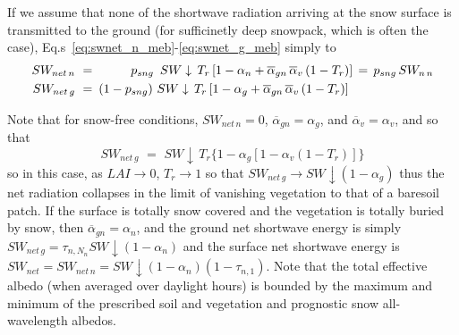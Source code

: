If we assume that none of the shortwave radiation arriving at the
snow surface is transmitted to the ground (for sufficinetly deep
snowpack, which is often the case), 
Eq.s~\ref{eq:swnet_n_meb}-\ref{eq:swnet_g_meb} simply to
%
\begin{align}
\label{eq:swnet_n_meb_nt}
SW_{net\,n} \,\,=&\,\, 
\hskip.38in p_{sng}\,\,\, SW\downarrow \, T_r 
\left[
1 - \alpha_n + {\overline\alpha}_{gn}\, 
{\overline\alpha}_v \left(1-T_r\right)
\right]
\,=\, p_{sng}\, SW_{n\,n}
\\
\label{eq:swnet_g_meb_nt}
SW_{net\,g} \,\,=&\,\, \left(1-p_{sng}\right) \, SW\downarrow \, T_r 
\left[
1 - \alpha_g + {\overline\alpha}_{gn}\, 
{\overline\alpha}_v \left(1-T_r\right)
\right] 
%
\end{align}


Note that for snow-free conditions, $SW_{net\,n}=0$,
${\overline\alpha}_{gn} = \alpha_g$, and
${\overline\alpha}_v = \alpha_v$, and
 so that
%
\begin{equation}
SW_{net\,g} \,\,=\,\, SW\downarrow \, T_r 
\big\lbrace
1 - \alpha_g \left[
1 - \alpha_v \left(1-T_r\right)\right]
\big\rbrace 
%
\end{equation}
%
so in this case, as $LAI\rightarrow 0$, $T_r\rightarrow 1$ so that
$SW_{net\,g} \rightarrow SW\downarrow \left( 1 -\alpha_g\right)$
thus the net radiation collapses in the limit of vanishing vegetation
to that of a baresoil patch. 
If the surface is totally snow covered
and the vegetation is totally buried by snow, then
${\overline\alpha}_{gn}=\alpha_n$, 
and the ground net shortwave energy 
is simply $SW_{net\,g} = \tau_{n,N_n}SW\downarrow \left(1-\alpha_n\right)$ 
and the surface net shortwave energy is
$SW_{net} = SW_{net\,n} = SW\downarrow \left(1-\alpha_n\right) \left(1- \tau_{n,1}\right)$.
%
Note that the total effective albedo
(when averaged over daylight hours) is bounded by the maximum and
minimum of the prescribed soil and vegetation and prognostic
snow all-wavelength albedos.


